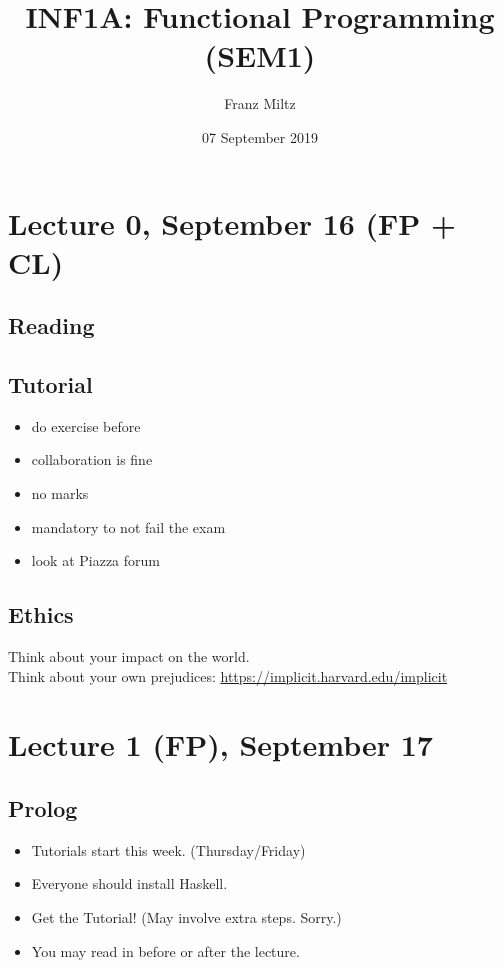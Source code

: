 \documentclass{article}
\begin{document}
\title{INF1A: Functional Programming (SEM1)}
\author{Franz Miltz}
\date{07 September 2019}
\maketitle
\tableofcontents
\pagebreak
\section{Lecture 0, September 16 (FP + CL)}
\subsection{Reading}
\subsection{Tutorial}
\begin{itemize}
    \item do exercise before
    \item collaboration is fine
    \item no marks
    \item mandatory to not fail the exam
\end{itemize}
\begin{itemize}
    \item look at Piazza forum
\end{itemize}
\subsection{Ethics}
Think about your impact on the world.\\
Think about your own prejudices:
\url{https://implicit.harvard.edu/implicit}
\section{Lecture 1 (FP), September 17}
\subsection{Prolog}
\begin{itemize}
    \item Tutorials start this week. (Thursday/Friday)
    \item Everyone should install Haskell.
    \item Get the Tutorial! (May involve extra steps. Sorry.)
    \item You may read in before or after the lecture.
\end{itemize}
\end{document}
